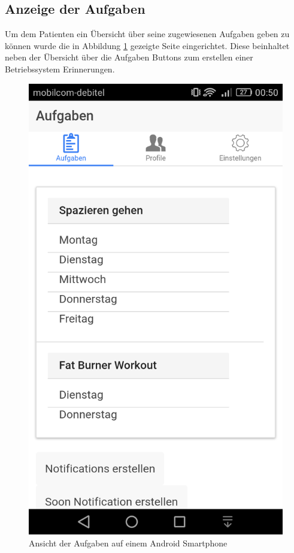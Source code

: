 \subsection{Anzeige der Aufgaben}\label{_ImpPCAufgaben}
Um dem Patienten ein Übersicht über seine zugewiesenen Aufgaben geben zu können wurde die in Abbildung \ref{PatientClient_AufgabenUebersicht} gezeigte Seite eingerichtet. Diese beinhaltet neben der Übersicht über die Aufgaben Buttons zum erstellen einer Betriebssystem Erinnerungen. 

\begin{figure}[H]
	\centering
	\includegraphics[scale=0.25]{images/Screenshots/PatientClient/AufgabenUebersicht}
	\caption[Ansicht der Aufgaben auf einem Android Smartphone]{Ansicht der Aufgaben auf einem Android Smartphone}
	\label{PatientClient_AufgabenUebersicht}
\end{figure}

